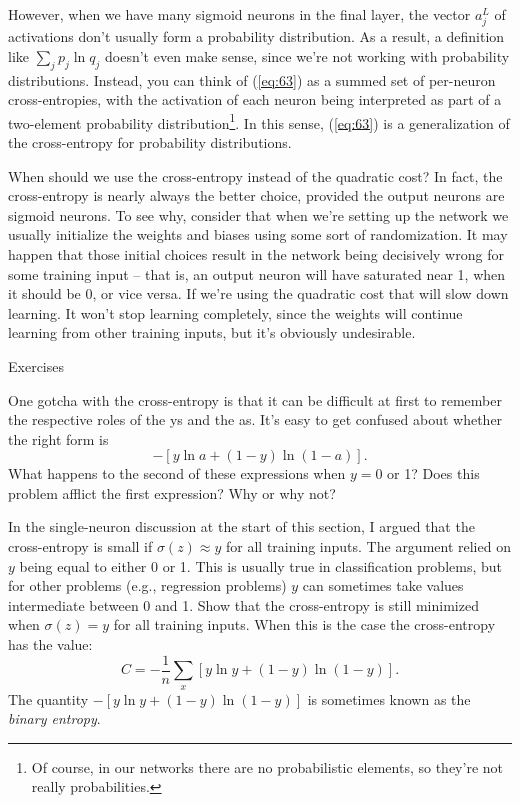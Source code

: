 \documentclass[a4paper,twoside,10pt]{book}
\begin{document}
However, when we have many sigmoid neurons in the final layer, the vector $a^L_j$ of activations don't usually form a probability distribution. As a result, a definition like $\sum_j p_j \ln q_j$ doesn't even make sense, since we're not working with probability distributions. Instead, you can think of (\ref{eq:63}) as a summed set of per-neuron cross-entropies, with the activation of each neuron being interpreted as part of a two-element probability distribution\footnote{Of course, in our networks there are no probabilistic elements, so they're not really probabilities.}. In this sense, (\ref{eq:63}) is a generalization of the cross-entropy for probability distributions.

When should we use the cross-entropy instead of the quadratic cost? In fact, the cross-entropy is nearly always the better choice, provided the output neurons are sigmoid neurons. To see why, consider that when we're setting up the network we usually initialize the weights and biases using some sort of randomization. It may happen that those initial choices result in the network being decisively wrong for some training input -- that is, an output neuron will have saturated near 1, when it should be 0, or vice versa. If we're using the quadratic cost that will slow down learning. It won't stop learning completely, since the weights will continue learning from other training inputs, but it's obviously undesirable.


\begin{exercize}{Exercises}
	\item One gotcha with the cross-entropy is that it can be difficult at first to remember the respective roles of the ys and the as. It's easy to get confused about whether the right form is $$-[y \ln a + (1-y) \ln (1-a)].$$ What happens to the second of these expressions when $y=0$ or 1? Does this problem afflict the first expression? Why or why not?
	\item In the single-neuron discussion at the start of this section, I argued that the cross-entropy is small if $\sigma(z)\approx y$ for all training inputs. The argument relied on $y$ being equal to either 0 or 1. This is usually true in classification problems, but for other problems (e.g., regression problems) $y$ can sometimes take values intermediate between 0 and 1. Show that the cross-entropy is still minimized when $\sigma(z)=y$ for all training inputs. When this is the case the cross-entropy has the value:
	\begin{equation}
		C = -\frac{1}{n} \sum_x [y \ln y+(1-y) \ln(1-y)].
		\label{eq:64}
	\end{equation}
	The quantity $-\left[y \ln y+(1-y) \ln(1-y)\right]$ is sometimes known as the \textit{binary entropy}.
\end{exercize}
\end{document}
